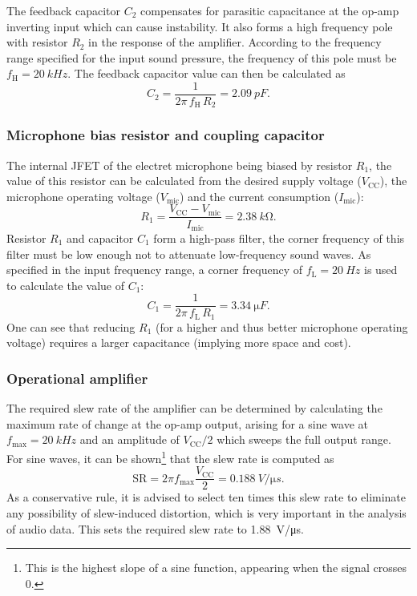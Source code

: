 \documentclass{EPL-master-thesis-covers-EN}
\newcommand{\te}[1]{\textrm{#1}}
\begin{document}
The feedback capacitor $C_2$ compensates for parasitic capacitance at the op-amp inverting input which can cause instability. It also forms a high frequency pole with resistor $R_2$ in the response of the amplifier. According to the frequency range specified for the input sound pressure, the frequency of this pole must be $f_\te{H} = \SI{20}{kHz}$. The feedback capacitor value can then be calculated as
\[
 C_2 = \frac{1}{2 \pi \, f_\te{H} \, R_2} = \SI{2.09}{pF}.
\]

\subsubsection*{Microphone bias resistor and coupling capacitor}

The internal JFET of the electret microphone being biased by resistor $R_1$, the value of this resistor can be calculated from the desired supply voltage ($V_\te{CC}$), the microphone operating voltage ($V_\te{mic}$) and the current consumption ($I_\te{mic}$):
\[
 R_1 = \frac{V_\te{CC} - V_\te{mic}}{I_\te{mic}} = \SI{2.38}{k\ohm}.
\]
Resistor $R_1$ and capacitor $C_1$ form a high-pass filter, the corner frequency of this filter must be low enough not to attenuate low-frequency sound waves. As specified in the input frequency range, a corner frequency of $f_\te{L} = \SI{20}{Hz}$ is used to calculate the value of $C_1$:
\[
 C_1 = \frac{1}{2 \pi \, f_\te{L} \, R_1} = \SI{3.34}{\micro F}.
\]
One can see that reducing $R_1$ (for a higher and thus better microphone operating voltage) requires a larger capacitance (implying more space and cost).

\subsubsection*{Operational amplifier}

The required slew rate of the amplifier can be determined by calculating the maximum rate of change at the op-amp output, arising  for a sine wave at $f_\te{max} = \SI{20}{kHz}$ and an amplitude of $V_\te{CC}/2$ which sweeps the full output range. For sine waves, it can be shown\footnote{This is the highest slope of a sine function, appearing when the signal crosses 0.} that the slew rate is computed as
\[
 \te{SR} = 2 \pi f_\te{max} \frac{V_\te{CC}}{2} = \SI{0.188}{V/\micro s}.
\]
As a conservative rule, it is advised to select ten times this slew rate to eliminate any possibility of slew-induced distortion, which is very important in the analysis of audio data. This sets the required slew rate to \SI{1.88}{V/\micro s}.
\end{document}
